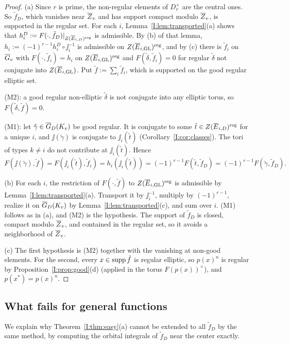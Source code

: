\begin{proof}
(a) Since $r$ is prime, the non-regular elements of $D_v^\times$ are the central ones. So $\tilde f_D$, which vanishes near $\overline{Z}_v$ and has support compact modulo $\overline{Z}_v$, is supported in the regular set. For each $i$, Lemma~\ref{I:lem:transported}(a) shows that $h_i^D:=F(\cdot,\tilde f_D)|_{Z(\overline{E}_{i,D})^{\mathrm{reg}}}$ is admissible. By (b) of that lemma, $h_i:=(-1)^{r-1}h_i^D\circ\jj_i^{-1}$ is admissible on $Z(\overline{E}_{i,\mathrm{GL}})^{\mathrm{reg}}$, and by (c) there is $\tilde f_i$ on $\overline{G}_v$ with $F(\cdot,\tilde f_i)=h_i$ on $Z(\overline{E}_{i,\mathrm{GL}})^{\mathrm{reg}}$ and $F(\tilde\delta,\tilde f_i)=0$ for regular $\tilde\delta$ not conjugate into $Z(\overline{E}_{i,\mathrm{GL}})$. Put $\tilde f:=\sum_i\tilde f_i$, which is supported on the good regular elliptic set.

(M2): a good regular non-elliptic $\tilde\delta$ is not conjugate into any elliptic torus, so $F(\tilde\delta,\tilde f)=0$.

(M1): let $\tilde\gamma\in\overline{G}_D(K_v)$ be good regular. It is conjugate to some $\tilde t\in Z(\overline{E}_{i,D})^{\mathrm{reg}}$ for a unique $i$, and $\jj(\tilde\gamma)$ is conjugate to $\jj_i(\tilde t)$ (Corollary~\ref{I:cor:classes}). The tori of types $k\ne i$ do not contribute at $\jj_i(\tilde t)$. Hence
\[ F(\jj(\tilde\gamma),\tilde f)=F(\jj_i(\tilde t),\tilde f_i)=h_i(\jj_i(\tilde t))=(-1)^{r-1}F(\tilde t,\tilde f_D)=(-1)^{r-1}F(\tilde\gamma,\tilde f_D). \]

(b) For each $i$, the restriction of $F(\cdot,\tilde f)$ to $Z(\overline{E}_{i,\mathrm{GL}})^{\mathrm{reg}}$ is admissible by Lemma~\ref{I:lem:transported}(a). Transport it by $\jj_i^{-1}$, multiply by $(-1)^{r-1}$, realize it on $\overline{G}_D(K_v)$ by Lemma~\ref{I:lem:transported}(c), and sum over $i$. (M1) follows as in (a), and (M2) is the hypothesis. The support of $\tilde f_D$ is closed, compact modulo $\overline{Z}_v$, and contained in the regular set, so it avoids a neighborhood of $\overline{Z}_v$.

(c) The first hypothesis is (M2) together with the vanishing at non-good elements. For the second, every $x\in\operatorname{supp}\tilde f$ is regular elliptic, so $p(x)^n$ is regular by Proposition~\ref{I:prop:good}(d) (applied in the torus $F(p(x))^\times$), and $p(x^*)=p(x)^n$.
\end{proof}

\subsection{What fails for general functions}\label{I:subsec:general}
We explain why Theorem~\ref{I:thm:easy}(a) cannot be extended to all $\tilde f_D$ by the same method, by computing the orbital integrals of $\tilde f_D$ near the center exactly.

